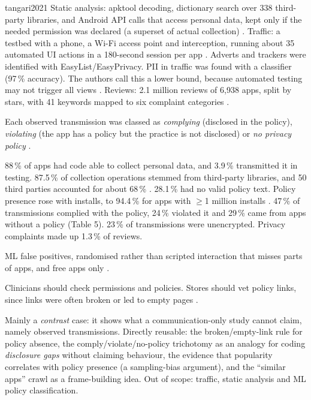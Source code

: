 \begin{papercard}{tangari2021}
 Static analysis: apktool decoding, dictionary search over 338 third-party libraries, and Android API calls that access personal data, kept only if the needed permission was declared (a superset of actual collection) . Traffic: a testbed with a phone, a Wi-Fi access point and interception, running about 35 automated UI actions in a 180-second session per app . Adverts and trackers were identified with EasyList/EasyPrivacy. PII in traffic was found with a classifier (97\,\% accuracy). The authors call this a lower bound, because automated testing may not trigger all views . Reviews: 2.1 million reviews of 6{,}938 apps, split by stars, with 41 keywords mapped to six complaint categories .

 Each observed transmission was classed as \emph{complying} (disclosed in the policy), \emph{violating} (the app has a policy but the practice is not disclosed) or \emph{no privacy policy} .

 88\,\% of apps had code able to collect personal data, and 3.9\,\% transmitted it in testing. 87.5\,\% of collection operations stemmed from third-party libraries, and 50 third parties accounted for about 68\,\% . 28.1\,\% had no valid policy text. Policy presence rose with installs, to 94.4\,\% for apps with $\geq$1 million installs . 47\,\% of transmissions complied with the policy, 24\,\% violated it and 29\,\% came from apps without a policy (Table 5). 23\,\% of transmissions were unencrypted. Privacy complaints made up 1.3\,\% of reviews.

 ML false positives, randomised rather than scripted interaction that misses parts of apps, and free apps only .

 Clinicians should check permissions and policies. Stores should vet policy links, since links were often broken or led to empty pages .

 Mainly a \emph{contrast} case: it shows what a communication-only study cannot claim, namely observed transmissions. Directly reusable: the broken/empty-link rule for policy absence, the comply/violate/no-policy trichotomy as an analogy for coding \emph{disclosure gaps} without claiming behaviour, the evidence that popularity correlates with policy presence (a sampling-bias argument), and the ``similar apps'' crawl as a frame-building idea. Out of scope: traffic, static analysis and ML policy classification.
\end{papercard}
